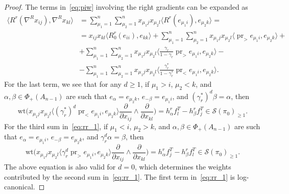 \documentclass[11pt]{article}
\DeclareMathOperator{\pr}{pr}
\theoremstyle{definition}\newtheorem{definition}[theorem]{Definition}
\theoremstyle{definition}\newtheorem{remark}[theorem]{Remark}
\theoremstyle{remark}
\numberwithin{equation}{section}
\begin{document}
\begin{proof}
    The terms in~\eqref{eq:piw} involving the right gradients can be expanded as
    \begin{equation}\label{eq:rr_1}
    \begin{split}
        \langle R^r(\nabla^R x_{ij}),\nabla^R x_{kl} \rangle &= \sum_{\mu_1=1}^n\sum_{\mu_2=1}^n x_{\mu_1 j} x_{\mu_2 l} \langle R^r(e_{\mu_1 i}),e_{\mu_2 k}\rangle = \\ &=x_{ij}x_{kl}\langle R_0^r(e_{ii}),e_{kk}\rangle +  \sum_{\mu_1=1}^n\sum_{\mu_2=1}^n x_{\mu_1 j} x_{\mu_2 l}\langle \pr_{>} e_{\mu_1 i}, e_{\mu_2 k}\rangle + \\ &+ \sum_{\mu_1=1}^n\sum_{\mu_2=1}^n x_{\mu_1 j} x_{\mu_2 l}\langle \frac{\gamma_r}{1-\gamma_r}\pr_{>}e_{\mu_1 i},e_{\mu_2 k}\rangle  - \\ &-\sum_{\mu_1=1}^n\sum_{\mu_2=1}^n x_{\mu_1 j} x_{\mu_2 l}\langle \frac{\gamma_r^*}{1-\gamma_r^*}\pr_{<}e_{\mu_1 i},e_{\mu_2 k}\rangle.
        \end{split}
    \end{equation}
    For the last term, we see that for any $d \geq 1$, if $\mu_1 > i$, $\mu_2 < k$, and $\alpha,\beta \in \Phi_+(A_{n-1})$ are such that $e_{\alpha} = e_{\mu_2 k}$, $e_{-\beta} = e_{\mu_1 i}$, and $(\gamma_r^*)^d\beta = \alpha$, then
    \begin{equation}\label{eq:rr_4}
        \mathrm{wt} \Big( x_{\mu_1 j} x_{\mu_2 l} \langle (\gamma_r^*)^d \pr_{<} e_{\mu_1 i},e_{\mu_2 k}\rangle \frac{\partial}{\partial x_{ij}}\wedge \frac{\partial}{\partial x_{kl}} \Big) = h_{\alpha}^r f_l^T - h_{\beta}^r f_j^T \in \mathcal{S}(\pi_0)_{\geq 1}.
    \end{equation}
    For the third sum in~\eqref{eq:rr_1}, if $\mu_1 < i$, $\mu_2 > k$, and $\alpha,\beta \in \Phi_+(A_{n-1})$ are such that $e_{\alpha} = e_{\mu_1 i}$, $e_{-\beta} = e_{\mu_2 k}$, and $\gamma_r^d\alpha = \beta$, then
    \begin{equation}\label{eq:rr_3}
        \mathrm{wt} \Big(x_{\mu_1 j} x_{\mu_2 l}\langle \gamma_r^d\pr_> e_{\mu_1i},e_{\mu_2 k}\rangle \frac{\partial}{\partial x_{ij}}\wedge \frac{\partial}{\partial x_{kl}} \Big) = h_{\alpha}^r f_j^T - h_{\beta}^r f_l^T \in \mathcal{S}(\pi_0)_{\geq 1}.
    \end{equation}
    The above equation is also valid for $d=0$, which determines the weights contributed by the second sum in~\eqref{eq:rr_1}.
    The first term in~\eqref{eq:rr_1} is log-canonical.


\end{proof}
\end{document}
